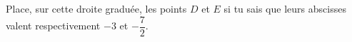 %
%
Place, sur cette droite graduée, les points $D$ et $E$ si tu sais que leurs abscisses valent respectivement $-3$ et $-\dfrac{7}{2}$.
